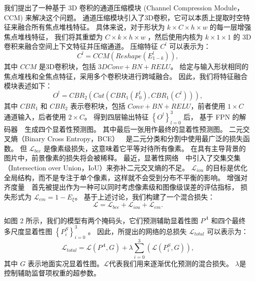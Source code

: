 %
%
%
%
\par
%
%
我们提出了一种基于 3D 卷积的通道压缩模块 (Channel Compression Module，CCM) 来解决这个问题。 
通道压缩模块引入了3D卷积，它可以本质上提取时空特征来融合所有焦点堆栈特征。
具体来说，对于形状为 $ k \times C \times h \times w $ 的每一层增强焦点堆栈特征，
我们将其重塑为 $ C \times  k \times  h \times w $ ，然后使用内核为 $ k \times 1 \times 1 $  的 3D 卷积来融合空间上下文特征并压缩通道。 压缩特征 $ C^{l} $ 可以表示为：
%
%
\begin{equation}
	C^{l} = CCM \left ( Reshape \left ( E_{1-k}^{l} \right ) \right ) ,
\end{equation}
%
%
其中 $CCM$ 是3D卷积块，包括 $3DConv+BN+RELU$。 给定与输入形状相同的焦点堆栈和全焦点特征，采用多个卷积块进行跨域融合。 因此，我们将特征融合模块表述如下：
%
%
%	
\begin{equation}
	O^{l}=CBR_{2}\left (Cat \left (CBR_{1} \left (F_{0}^{l} \right ),CBR_{1} \left (C^{l} \right ) \right ) \right ),
\end{equation}
%
%
其中 $CBR_{1}$ 和 $CBR_{2}$ 表示卷积块，包括 $Conv+BN+RELU$，前者使用 $1 \times C$ 通道输入，后者使用 $2 \times C$。
得到四层输出特征 $\left \{ O^{l} \right \}_{l=0}^{3} $ 后， 基于 FPN 的解码器~\cite{lin2017feature}~生成四个显着性预测图。 
其中最后一张用作最终的显着性预测图。 
%
%
%
%
%
%
%
%
%
二元交叉熵（Binary Cross Entropy，BCE）~\cite{de2005tutorial}~是二元分类和分割中使用最广泛的损失函数。 但 $\mathcal L_{bce} $ 是像素级损失，这意味着它平等对待所有像素。
在具有主导背景的图片中，前景像素的损失将会被稀释。 最近，显著性网络~\cite{qin2019basnet}~中引入了交集交集（Intersection over Union，IoU）来弥补二元交叉熵的不足。
$ \mathcal L_{iou} $ 的目标是优化全局结构，而不是专注于单个像素，这样就不会受到分布不平衡的影响。 增强对齐度量~\cite{fan2018enhanced}~首先被提出作为一种可以同时考虑像素级和图像级误差的评估指标，
损失形式为 $ \mathcal L_{em} = 1 - E_{\xi} $。 基于上述讨论，我们构建了一个混合损失：
%
%
%
\begin{equation} 
	\mathcal L = \mathcal L_{bce} + \mathcal L_{iou}  + \mathcal L_{em}  .
\end{equation}
%
%
%
%
\par
%
%
如图 2 所示，我们的模型有两个掩码头，它们预测辅助显着性图 $ P^{A} $ 和四个最终多尺度显着性图 $ \left \{ P_{i}^{S} \right \}_{i=0}^{3} $ 。 因此，所提出的网络的总损失 $ \mathcal L_{total} $ 可以表示为： 
%
\begin{equation}
	\mathcal L_{total} = \mathcal L\left ( P^{A}, G \right ) + \lambda  \sum_{i=0}^{3} \left ( \mathcal L \left (  P_{i}^{S},G \right )\right ),
\end{equation}
%
%
%
其中 $ G $ 表示地面实况显着性图。$ \mathcal L $代表我们用来逐渐优化预测的混合损失。 $ \lambda $是控制辅助监督项权重的超参数。
%
%
%
%
%
%
%
%
%
%
%
%



